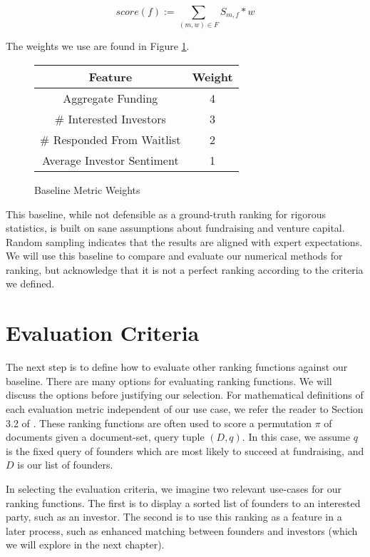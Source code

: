 \begin{equation}
\label{eq:baseline}
  score(f) := \sum_{(m, w) \in F} S_{m, f} * w
\end{equation}

\noindent The weights we use are found in Figure \ref{fig:nfr:baseline:weights}.

\begin{figure}[ht]
\begin{tabular}{c | c}
\textbf{Feature}           & \textbf{Weight} \\\hline
Aggregate Funding          & 4 \\\hline
\# Interested Investors    & 3 \\\hline
\# Responded From Waitlist & 2 \\\hline
Average Investor Sentiment & 1
\end{tabular}
\centering
\caption{Baseline Metric Weights}
\label{fig:nfr:baseline:weights}
\end{figure}

This baseline, while not defensible as a ground-truth ranking for rigorous statistics, is built on sane assumptions about fundraising and venture capital. Random sampling indicates that the results are aligned with expert expectations. We will use this baseline to compare and evaluate our numerical methods for ranking, but acknowledge that it is not a perfect ranking according to the criteria we defined.

\section{Evaluation Criteria}

The next step is to define how to evaluate other ranking functions against our baseline. There are many options for evaluating ranking functions. We will discuss the options before justifying our selection. For mathematical definitions of each evaluation metric independent of our use case, we refer the reader to Section 3.2 of \cite{DBLP:journals/corr/abs-0704-3359}. These ranking functions are often used to score a permutation $\pi$ of documents given a document-set, query tuple $(D, q)$. In this case, we assume $q$ is the fixed query of founders which are most likely to succeed at fundraising, and $D$ is our list of founders.

In selecting the evaluation criteria, we imagine two relevant use-cases for our ranking functions. The first is to display a sorted list of founders to an interested party, such as an investor. The second is to use this ranking as a feature in a later process, such as enhanced matching between founders and investors (which we will explore in the next chapter).

